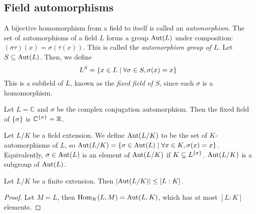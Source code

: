 \subsection{Field automorphisms}
\begin{definition}
	A bijective homomorphism from a field to itself is called an \emph{automorphism}.
	The set of automorphisms of a field \( L \) forms a group \( \operatorname{Aut}(L) \) under composition: \( (\sigma\tau)(x) = \sigma(\tau(x)) \).
	This is called the \emph{automorphism group of \( L \)}.
	Let \( S \subseteq \operatorname{Aut}(L) \).
	Then, we define
	\[ L^S = \qty{x \in L \mid \forall \sigma \in S, \sigma(x) = x} \]
	This is a subfield of \( L \), known as the \emph{fixed field of \( S \)}, since each \( \sigma \) is a homomorphism.
\end{definition}
\begin{example}
	Let \( L = \mathbb C \) and \( \sigma \) be the complex conjugation automorphism.
	Then the fixed field of \( \qty{\sigma} \) is \( \mathbb C^{\qty{\sigma}} = \mathbb R \).
\end{example}
\begin{definition}
	Let \( L / K \) be a field extension.
	We define \( \operatorname{Aut}(L/K) \) to be the set of \( K \)-automorphisms of \( L \), so \( \operatorname{Aut}(L/K) = \qty{\sigma \in \operatorname{Aut}(L) \mid \forall x \in K, \sigma(x) = x} \).
	Equivalently, \( \sigma \in \operatorname{Aut}(L) \) is an element of \( \operatorname{Aut}(L/K) \) if \( K \subseteq L^{\qty{\sigma}} \).
	\( \operatorname{Aut}(L/K) \) is a subgroup of \( \operatorname{Aut}(L) \).
\end{definition}
\begin{theorem}
	Let \( L / K \) be a finite extension.
	Then \( \abs{\operatorname{Aut}(L/K)} \leq [L:K] \).
\end{theorem}
\begin{proof}
	Let \( M = L \), then \( \operatorname{Hom}_K(L,M) = \operatorname{Aut}(L,K) \), which has at most \( [L:K] \) elements.
\end{proof}
